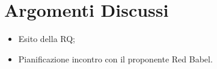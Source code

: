 \section{Argomenti Discussi}
	\begin{itemize}
		\item Esito della RQ;
		\item Pianificazione incontro con il proponente Red Babel.
	\end{itemize}